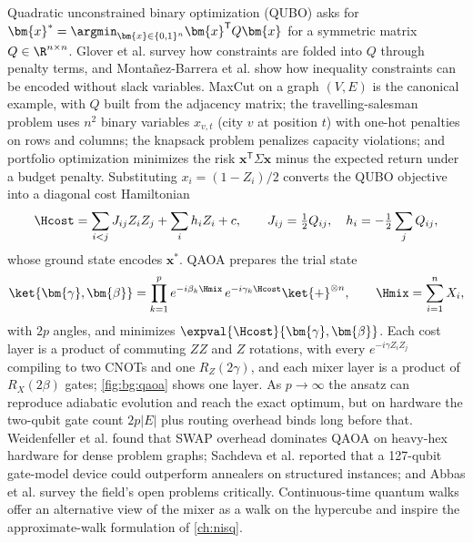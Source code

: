 Quadratic unconstrained binary optimization (QUBO) asks for $\bm{x}^{\ast}=\argmin_{\bm{x}\in\{0,1\}^n}\bm{x}^{\mathsf{T}}Q\bm{x}$ for a symmetric matrix $Q\in\R^{n\times n}$. Glover et al. \cite{glover2018qubo} survey how constraints are folded into $Q$ through penalty terms, and Monta{\~n}ez-Barrera et al. \cite{montanezbarrera2024unbalanced} show how inequality constraints can be encoded without slack variables. MaxCut on a graph $(V,E)$ is the canonical example, with $Q$ built from the adjacency matrix; the travelling-salesman problem uses $n^2$ binary variables $x_{v,t}$ (city $v$ at position $t$) with one-hot penalties on rows and columns; the knapsack problem penalizes capacity violations; and portfolio optimization minimizes the risk $\bm{x}^{\mathsf{T}}\Sigma\bm{x}$ minus the expected return under a budget penalty. Substituting $x_i=(1-Z_i)/2$ converts the QUBO objective into a diagonal cost Hamiltonian
\begin{equation}\label{eq:bg:hcost}
\Hcost=\sum_{i<j}J_{ij}Z_iZ_j+\sum_{i}h_iZ_i+c,\qquad J_{ij}=\tfrac12Q_{ij},\quad h_i=-\tfrac12\sum_{j}Q_{ij},
\end{equation}
whose ground state encodes $\bm{x}^{\ast}$. QAOA \cite{farhi2014qaoa} prepares the trial state
\begin{equation}\label{eq:bg:qaoa}
\ket{\bm{\gamma},\bm{\beta}}=\prod_{k=1}^{p}e^{-i\beta_k\Hmix}\,e^{-i\gamma_k\Hcost}\ket{+}^{\otimes n},\qquad \Hmix=\sum_{i=1}^{n}X_i,
\end{equation}
with $2p$ angles, and minimizes $\expval{\Hcost}{\bm{\gamma},\bm{\beta}}$. Each cost layer is a product of commuting $ZZ$ and $Z$ rotations, with every $e^{-i\gamma Z_iZ_j}$ compiling to two CNOTs and one $R_Z(2\gamma)$, and each mixer layer is a product of $R_X(2\beta)$ gates; \cref{fig:bg:qaoa} shows one layer. As $p\to\infty$ the ansatz can reproduce adiabatic evolution and reach the exact optimum, but on hardware the two-qubit gate count $2p|E|$ plus routing overhead binds long before that. Weidenfeller et al. \cite{weidenfeller2022qaoascaling} found that SWAP overhead dominates QAOA on heavy-hex hardware for dense problem graphs; Sachdeva et al. \cite{sachdeva2024qaoa127} reported that a 127-qubit gate-model device could outperform annealers on structured instances; and Abbas et al. \cite{abbas2024challengesqopt} survey the field's open problems critically. Continuous-time quantum walks \cite{childs2009quantumwalk} offer an alternative view of the mixer as a walk on the hypercube and inspire the approximate-walk formulation of \cref{ch:nisq}.


